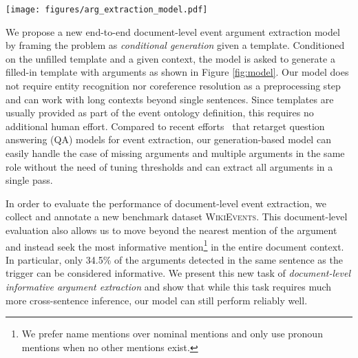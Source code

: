 \begin{figure*}[t]
    \centering
    \texttt{[image: figures/arg\_extraction\_model.pdf]}
    \caption{Our argument extraction model using conditional generation. On the left we show an example document, template and the desired output for the instance.  Each example document may contain multiple event triggers and we use special $\langle tgr \rangle$ tokens to markup the target event trigger for argument extraction (the highlighted word ``reserved"). The input to the model is the concatenation of the template and the document. The decoded tokens are either from the template or the document. The color of the generated tokens indicate its copy source. After the filled template is generated, we extract the spans to produce the final output. 
   }
    \label{fig:model}
  \vspace{-0.3cm}
\end{figure*}

We propose a new end-to-end document-level event argument extraction model by framing the problem as \textit{conditional generation} given a template. Conditioned on the unfilled template %
and a given context, the model is asked to generate a filled-in template with arguments as shown in Figure \ref{fig:model}. Our model does not require entity recognition nor coreference resolution as a preprocessing step and can work with long contexts beyond single sentences.
Since templates are usually provided as part of the event ontology definition, this requires no additional human effort. 
Compared to recent efforts~\cite{Du2020EventQA, Feng2020ProbingAF, Chen2019ReadingTheManual} that retarget question answering (QA)  models for event extraction, our generation-based model can easily handle the case of missing arguments and multiple arguments in the same role without the need of tuning thresholds and can extract all arguments in a single pass. 

In order to evaluate the performance of document-level event extraction, we collect and annotate a new benchmark dataset \textsc{WikiEvents}.
This document-level evaluation also allows us to move beyond the nearest mention of the argument and instead seek the most informative mention\footnote{We prefer name mentions over nominal mentions and only use pronoun mentions when no other mentions exist.} in the entire document context. 
In particular, only 34.5\% of the arguments detected in the same sentence as the trigger can be considered informative.  We present this new task of \textit{document-level informative argument extraction} and show that while this task requires much more cross-sentence inference, our model can still perform reliably well. 

